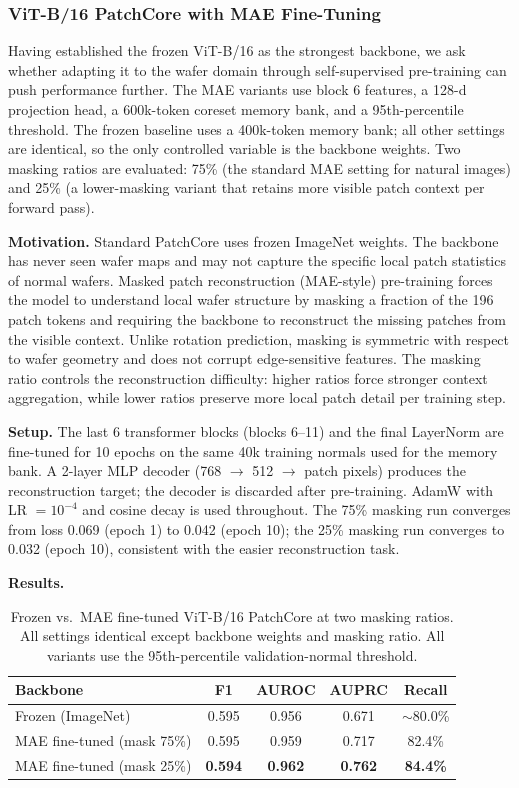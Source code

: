 \documentclass[11pt]{article}
\begin{document}
\subsubsection{ViT-B/16 PatchCore with MAE Fine-Tuning}

Having established the frozen ViT-B/16 as the strongest backbone, we ask whether adapting it to the wafer domain through self-supervised pre-training can push performance further.
The MAE variants use block 6 features, a 128-d projection head, a 600k-token coreset memory bank, and a 95th-percentile threshold. The frozen baseline uses a 400k-token memory bank; all other settings are identical, so the only controlled variable is the backbone weights.
Two masking ratios are evaluated: 75\% (the standard MAE setting for natural images) and 25\% (a lower-masking variant that retains more visible patch context per forward pass).

\textbf{Motivation.}
Standard PatchCore uses frozen ImageNet weights. The backbone has never seen wafer maps and may not capture the specific local patch statistics of normal wafers. Masked patch reconstruction (MAE-style) pre-training forces the model to understand local wafer structure by masking a fraction of the 196 patch tokens and requiring the backbone to reconstruct the missing patches from the visible context.
Unlike rotation prediction, masking is symmetric with respect to wafer geometry and does not corrupt edge-sensitive features.
The masking ratio controls the reconstruction difficulty: higher ratios force stronger context aggregation, while lower ratios preserve more local patch detail per training step.

\textbf{Setup.}
The last 6 transformer blocks (blocks 6--11) and the final LayerNorm are fine-tuned for 10 epochs on the same 40k training normals used for the memory bank.
A 2-layer MLP decoder (768 $\to$ 512 $\to$ patch pixels) produces the reconstruction target; the decoder is discarded after pre-training.
AdamW with LR $=10^{-4}$ and cosine decay is used throughout.
The 75\% masking run converges from loss 0.069 (epoch 1) to 0.042 (epoch 10); the 25\% masking run converges to 0.032 (epoch 10), consistent with the easier reconstruction task.

\textbf{Results.}

\begin{table}[H]
\centering
\caption{Frozen vs.\ MAE fine-tuned ViT-B/16 PatchCore at two masking ratios. All settings identical except backbone weights and masking ratio. All variants use the 95th-percentile validation-normal threshold.}
\label{tab:vit_mae_comparison}
\begin{tabular}{lcccc}
\toprule
Backbone & F1 & AUROC & AUPRC & Recall \\
\midrule
Frozen (ImageNet)          & 0.595          & 0.956          & 0.671          & ${\sim}$80.0\% \\
MAE fine-tuned (mask 75\%) & 0.595          & 0.959          & 0.717          & 82.4\% \\
MAE fine-tuned (mask 25\%) & \textbf{0.594} & \textbf{0.962} & \textbf{0.762} & \textbf{84.4\%} \\
\bottomrule
\end{tabular}
\end{table}
\end{document}
